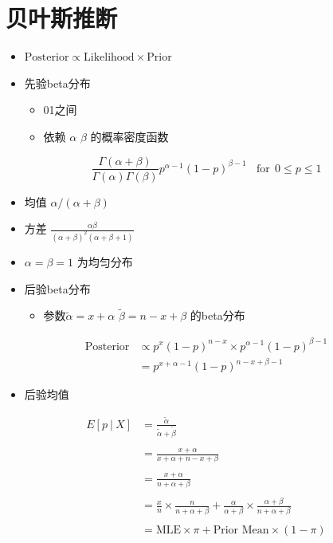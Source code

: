 \documentclass[]{book}
\providecommand{\tightlist}{%
  \setlength{\itemsep}{0pt}\setlength{\parskip}{0pt}}
\begin{document}
\section{贝叶斯推断}

\begin{itemize}
\tightlist
\item
  \(\mbox{Posterior} \propto \mbox{Likelihood} \times \mbox{Prior}\)
\item
  先验beta分布

  \begin{itemize}
  \tightlist
  \item
    01之间
  \item
    依赖 \(\alpha\) \(\beta\) 的概率密度函数
  \end{itemize}
\end{itemize}

\[
\frac{\Gamma(\alpha +  \beta)}{\Gamma(\alpha)\Gamma(\beta)}
 p ^ {\alpha - 1} (1 - p) ^ {\beta - 1} ~~~~\mbox{for} ~~ 0 \leq p \leq 1
\]

\begin{itemize}
\tightlist
\item
  均值 \(\alpha / (\alpha + \beta)\)
\item
  方差 \(\frac{\alpha \beta}{(\alpha + \beta)^2 (\alpha + \beta + 1)}\)
\item
  \(\alpha = \beta = 1\) 为均匀分布
\item
  后验beta分布

  \begin{itemize}
  \tightlist
  \item
    参数\(\tilde \alpha = x + \alpha\) \(\tilde \beta = n - x + \beta\) 的beta分布
  \end{itemize}
\end{itemize}

\begin{align}
\mbox{Posterior} &\propto  p^x(1 - p)^{n-x} \times p^{\alpha -1} (1 - p)^{\beta - 1} \\
                 &  =      p^{x + \alpha - 1} (1 - p)^{n - x + \beta - 1}
\end{align}

\begin{itemize}
\tightlist
\item
  后验均值
\end{itemize}

\begin{align}
E[p ~|~ X] & =   \frac{\tilde \alpha}{\tilde \alpha + \tilde \beta}\\ \\
& =  \frac{x + \alpha}{x + \alpha + n - x + \beta}\\ \\
& =  \frac{x + \alpha}{n + \alpha + \beta} \\ \\
& =  \frac{x}{n} \times \frac{n}{n + \alpha + \beta} + \frac{\alpha}{\alpha + \beta} \times \frac{\alpha + \beta}{n + \alpha + \beta} \\ \\
& =  \mbox{MLE} \times \pi + \mbox{Prior Mean} \times (1 - \pi)
\end{align}
\end{document}
